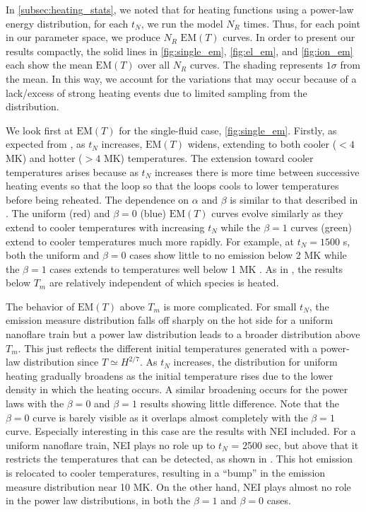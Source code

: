 \documentclass[preprint,linenumbers]{aastex}
\begin{document}
	\par In \autoref{subsec:heating_stats}, we noted that for heating functions using a power-law energy distribution, for each $t_N$, we run the model $N_R$ times. Thus, for each point in our parameter space, we produce $N_R$ $\mathrm{EM}(T)$ curves. In order to present our results compactly, the solid lines in \autoref{fig:single_em}, \autoref{fig:el_em}, and \autoref{fig:ion_em} each show the mean $\mathrm{EM}(T)$ over all $N_R$ curves. The shading represents $1\sigma$ from the mean. In this way, we account for the variations that may occur because of a lack/excess of strong heating events due to limited sampling from the distribution.
	\par We look first at $\mathrm{EM}(T)$ for the single-fluid case, \autoref{fig:single_em}. Firstly, as expected from \citet{cargill_active_2014}, as $t_N$ increases, $\mathrm{EM}(T)$ widens, extending to both cooler ($<4$ MK) and hotter ($>4$ MK) temperatures. The extension toward cooler temperatures arises because as $t_N$ increases there is more time between successive heating events so that the loop so that the loops cools to lower temperatures before being reheated. The dependence on $\alpha$ and $\beta$ is similar to that described in \citet{cargill_active_2014}. The uniform (red) and $\beta=0$ (blue) $\mathrm{EM}(T)$ curves evolve similarly as they extend to cooler temperatures with increasing $t_N$ while the $\beta=1$ curves (green) extend to cooler temperatures much more rapidly. For example, at $t_N=1500$ s, both the uniform and $\beta=0$ cases show little to no emission below 2 MK while the $\beta=1$ cases extends to temperatures well below 1 MK \citep{cargill_active_2014}. As in , the results below $T_m$ are relatively independent of which species is heated.
	\par The behavior of $\mathrm{EM}(T)$ above $T_m$ is more complicated. For small $t_N$, the emission measure distribution falls off sharply on the hot side for a uniform nanoflare train but a power law distribution leads to a broader distribution above $T_m$. This just reflects the different initial temperatures generated with a power-law distribution since $T \simeq H^{2/7}$. As $t_N$ increases, the distribution for uniform heating gradually broadens as the initial temperature rises due to the lower density in which the heating occurs. A similar broadening occurs for the power laws with the $\beta=0$ and $\beta=1$ results showing little difference. Note that the $\beta=0$ curve is barely visible as it overlaps almost completely with the $\beta=1$ curve. Especially interesting in this case are the results with NEI included. For a uniform nanoflare train, NEI plays no role up to $t_N$ = 2500 sec, but above that it restricts the temperatures that can be detected, as shown in . This hot emission is relocated to cooler temperatures, resulting in a ``bump'' in the emission measure distribution near 10 MK. On the other hand, NEI plays almost no role in the power law distributions, in both the $\beta=1$ and $\beta=0$ cases.
\end{document}

